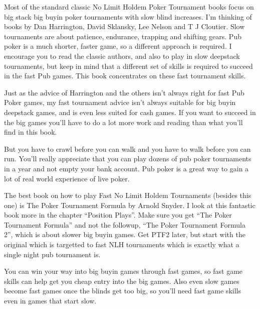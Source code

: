
Most of the standard classic No Limit Holdem Poker Tournament books
focus on big stack big buyin poker tournaments with slow blind increases.
I'm thinking of books by Dan Harrington, David Sklansky, Lee Nelson
and T J Cloutier. Slow tournaments are about patience, endurance,
trapping and shifting gears. Pub poker is a much shorter, faster game,
so a different approach is required. I encourage you to read the
classic authors, and also to play in slow deepstack tournaments,
but keep in mind that a different set of skills is required to succeed
in the fast Pub games. This book concentrates on these fast
tournament skills.

Just as the advice of Harrington and the others isn't always right
for fast Pub Poker games, my fast tournament advice isn't always
suitable for big buyin deepstack games, and is even less suited for
cash games. If you want to succeed in the big games you'll have to do a
lot more work and reading than what you'll find in this book.

But you have to crawl before you can walk and you have to walk before
you can run. You'll really appreciate that you can play dozens of pub
poker tournaments in a year and not empty your bank account. Pub poker
is a great way to gain a lot of real world experience of live poker.

The best book on how to play Fast No Limit Holdem Tournaments
(besides this one) is The Poker Tournament Formula by Arnold Snyder.
I look at this fantastic book more in the chapter ``Position Plays''.
Make sure you get ``The Poker Tournament Formula'' and not the followup,
``The Poker Tournament Formula 2'', which is about slower big buyin games.
Get PTF2 later, but start with the original which is targetted to fast
NLH tournaments which is exactly what a single night pub tournament is.

You can win your way into big buyin games through fast games,
so fast game skills can help get you cheap entry into the big games.
Also even slow games become fast games once the blinds get too big,
so you'll need fast game skills even in games that start slow.


